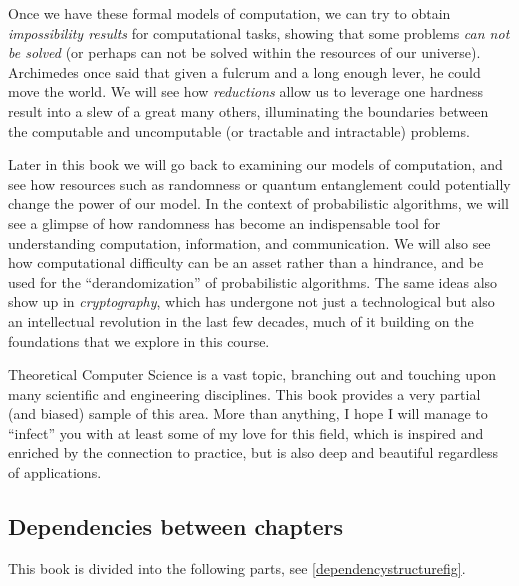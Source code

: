 Once we have these formal models of computation, we can try to obtain
\emph{impossibility results} for computational tasks, showing that some
problems \emph{can not be solved} (or perhaps can not be solved within
the resources of our universe). Archimedes once said that given a
fulcrum and a long enough lever, he could move the world. We will see
how \emph{reductions} allow us to leverage one hardness result into a
slew of a great many others, illuminating the boundaries between the
computable and uncomputable (or tractable and intractable) problems.

Later in this book we will go back to examining our models of
computation, and see how resources such as randomness or quantum
entanglement could potentially change the power of our model. In the
context of probabilistic algorithms, we will see a glimpse of how
randomness has become an indispensable tool for understanding
computation, information, and communication. We will also see how
computational difficulty can be an asset rather than a hindrance, and be
used for the ``derandomization'' of probabilistic algorithms. The same
ideas also show up in \emph{cryptography}, which has undergone not just
a technological but also an intellectual revolution in the last few
decades, much of it building on the foundations that we explore in this
course.

Theoretical Computer Science is a vast topic, branching out and touching
upon many scientific and engineering disciplines. This book provides a
very partial (and biased) sample of this area. More than anything, I
hope I will manage to ``infect'' you with at least some of my love for
this field, which is inspired and enriched by the connection to
practice, but is also deep and beautiful regardless of applications.

\subsection{Dependencies between
chapters}\label{Dependencies-between-chap}

This book is divided into the following parts, see
\cref{dependencystructurefig}.

